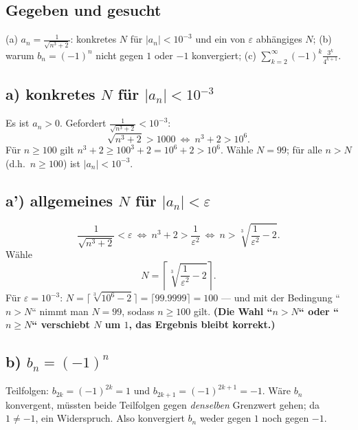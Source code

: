 

\subsection*{Gegeben und gesucht}
(a) $a_n=\frac1{\sqrt{n^3+2}}$: konkretes $N$ f\"ur $|a_n|<10^{-3}$ und ein
von $\varepsilon$ abh\"angiges $N$; (b) warum $b_n=(-1)^n$ nicht gegen $1$
oder $-1$ konvergiert; (c) $\sum_{k=2}^{\infty}(-1)^k\frac{3^k}{4^{k+1}}$.

\subsection*{a) konkretes $N$ f\"ur $|a_n|<10^{-3}$}
Es ist $a_n>0$. Gefordert $\frac1{\sqrt{n^3+2}}<10^{-3}$:
\begin{equation}
  \sqrt{n^3+2}>1000\ \Longleftrightarrow\ n^3+2>10^6 .
\end{equation}
F\"ur $n\ge100$ gilt $n^3+2\ge100^3+2=10^6+2>10^6$. W\"ahle $N=99$; f\"ur
alle $n>N$ (d.h.\ $n\ge100$) ist $|a_n|<10^{-3}$.

\subsection*{a') allgemeines $N$ f\"ur $|a_n|<\varepsilon$}
\begin{equation}
  \frac1{\sqrt{n^3+2}}<\varepsilon\ \Longleftrightarrow\
  n^3+2>\frac1{\varepsilon^2}\ \Longleftrightarrow\
  n>\sqrt[3]{\frac1{\varepsilon^2}-2}.
\end{equation}
W\"ahle
\begin{equation}
  N=\left\lceil\sqrt[3]{\frac1{\varepsilon^2}-2}\right\rceil .
\end{equation}
F\"ur $\varepsilon=10^{-3}$: $N=\lceil\sqrt[3]{10^6-2}\rceil
=\lceil99.9999\rceil=100$ --- und mit der Bedingung ``$n>N$`` nimmt man
$N=99$, sodass $n\ge100$ gilt. \textbf{(Die Wahl ``$n>N$`` oder ``$n\ge N$``
verschiebt $N$ um $1$, das Ergebnis bleibt korrekt.)}

\subsection*{b) $b_n=(-1)^n$}
Teilfolgen: $b_{2k}=(-1)^{2k}=1$ und $b_{2k+1}=(-1)^{2k+1}=-1$. W\"are
$b_n$ konvergent, m\"ussten beide Teilfolgen gegen \emph{denselben}
Grenzwert gehen; da $1\neq-1$, ein Widerspruch. Also konvergiert $b_n$
weder gegen $1$ noch gegen $-1$.

